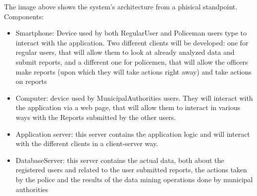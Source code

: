 The image above shows the system's architecture from a phisical standpoint.
Components:
\begin{itemize}
\item Smartphone: Device used by both RegularUser and Policeman users type to interact with the application. Two different clients will be developed: one for regular users, that will allow them to look at already analyzed data and submit reports, and a different one for policemen, that will allow the officers make reports (upon which they will take actions right away) and take actions on reports
\item Computer: device used by MunicipalAuthorities users. They will interact with the application via a web page, that will allow them to interact in various ways with the Reports submitted by the other users.
\item Application server: this server contains the application logic and will interact with the different clients in a client-server way.
\item DatabaseServer: this server contains the actual data, both about the registered users and related to the user submitted reports, the actions taken by the police and the results of the data mining operations done by municipal authorities
\end{itemize}

